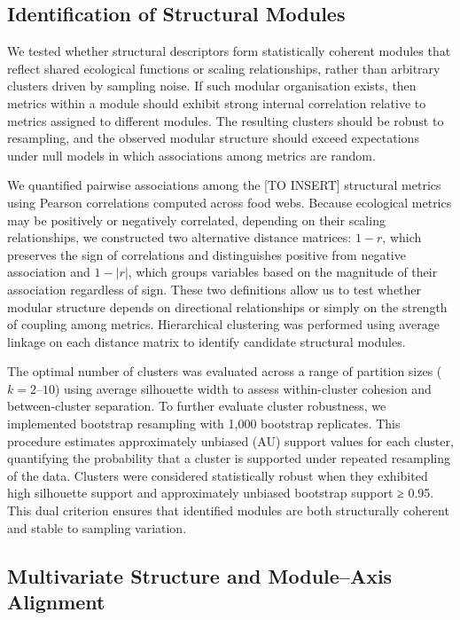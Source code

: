 \documentclass[
]{article}
\begin{document}
\subsection{Identification of Structural
Modules}\label{identification-of-structural-modules}

We tested whether structural descriptors form statistically coherent
modules that reflect shared ecological functions or scaling
relationships, rather than arbitrary clusters driven by sampling noise.
If such modular organisation exists, then metrics within a module should
exhibit strong internal correlation relative to metrics assigned to
different modules. The resulting clusters should be robust to
resampling, and the observed modular structure should exceed
expectations under null models in which associations among metrics are
random.

We quantified pairwise associations among the {[}TO INSERT{]} structural
metrics using Pearson correlations computed across food webs. Because
ecological metrics may be positively or negatively correlated, depending
on their scaling relationships, we constructed two alternative distance
matrices: \(1 − r\), which preserves the sign of correlations and
distinguishes positive from negative association and \(1 − |r|\), which
groups variables based on the magnitude of their association regardless
of sign. These two definitions allow us to test whether modular
structure depends on directional relationships or simply on the strength
of coupling among metrics. Hierarchical clustering was performed using
average linkage on each distance matrix to identify candidate structural
modules.

The optimal number of clusters was evaluated across a range of partition
sizes (\(k = 2–10\)) using average silhouette width to assess
within-cluster cohesion and between-cluster separation. To further
evaluate cluster robustness, we implemented bootstrap resampling with
1,000 bootstrap replicates. This procedure estimates approximately
unbiased (AU) support values for each cluster, quantifying the
probability that a cluster is supported under repeated resampling of the
data. Clusters were considered statistically robust when they exhibited
high silhouette support and approximately unbiased bootstrap support ≥
0.95. This dual criterion ensures that identified modules are both
structurally coherent and stable to sampling variation.

\subsection{Multivariate Structure and Module--Axis
Alignment}\label{multivariate-structure-and-moduleaxis-alignment}
\end{document}
